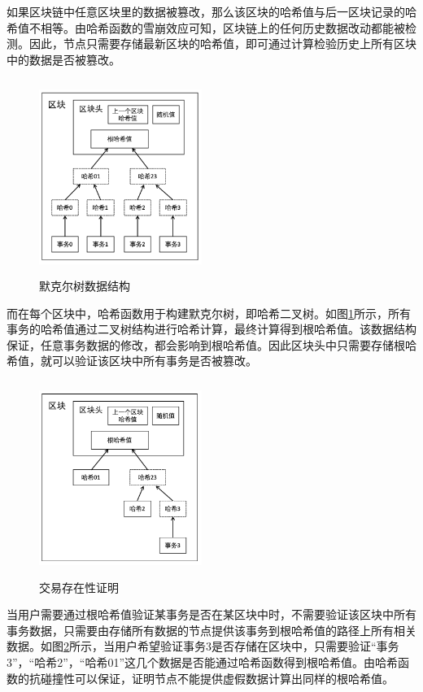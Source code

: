 如果区块链中任意区块里的数据被篡改，那么该区块的哈希值与后一区块记录的哈希值不相等。由哈希函数的雪崩效应可知，区块链上的任何历史数据改动都能被检测。因此，节点只需要存储最新区块的哈希值，即可通过计算检验历史上所有区块中的数据是否被篡改。

\begin{figure}
\centering	
\includegraphics [width=150pt,height=180pt]{figures/merkle-tree.png}
\caption{默克尔树数据结构}
\label{fig:merkle-tree}
\end{figure}

而在每个区块中，哈希函数用于构建默克尔树，即哈希二叉树。如图\ref{fig:merkle-tree}所示，所有事务的哈希值通过二叉树结构进行哈希计算，最终计算得到根哈希值。该数据结构保证，任意事务数据的修改，都会影响到根哈希值。因此区块头中只需要存储根哈希值，就可以验证该区块中所有事务是否被篡改。


\begin{figure}
\centering	
\includegraphics [width=150pt,height=180pt]{figures/merkle-proof.png}
\caption{交易存在性证明}
\label{fig:merkle-proof}
\end{figure}

当用户需要通过根哈希值验证某事务是否在某区块中时，不需要验证该区块中所有事务数据，只需要由存储所有数据的节点提供该事务到根哈希值的路径上所有相关数据。如图\ref{fig:merkle-proof}所示，当用户希望验证事务3是否存储在区块中，只需要验证“事务3”，“哈希2”，“哈希01”这几个数据是否能通过哈希函数得到根哈希值。由哈希函数的抗碰撞性可以保证，证明节点不能提供虚假数据计算出同样的根哈希值。

